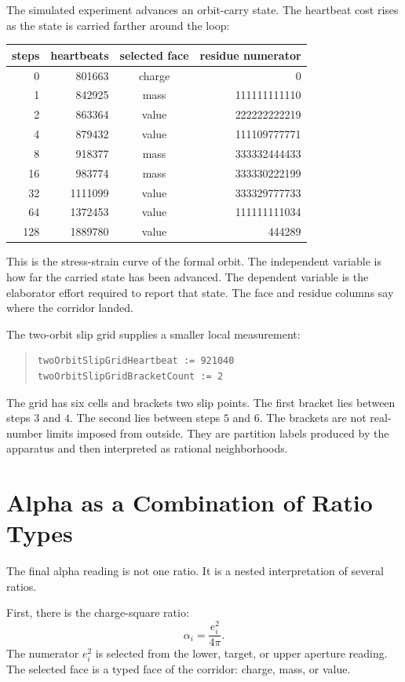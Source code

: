 The simulated experiment advances an orbit-carry state. The heartbeat cost rises as the state is carried farther
around the loop:
\begin{center}\small
\begin{tabular}{r|r|c|r}
steps & heartbeats & selected face & residue numerator\\
\hline
0 & 801663 & charge & 0\\
1 & 842925 & mass & 111111111110\\
2 & 863364 & value & 222222222219\\
4 & 879432 & value & 111109777771\\
8 & 918377 & mass & 333332444433\\
16 & 983774 & mass & 333330222199\\
32 & 1111099 & value & 333329777733\\
64 & 1372453 & value & 111111111034\\
128 & 1889780 & value & 444289
\end{tabular}
\end{center}
This is the stress-strain curve of the formal orbit. The independent variable is how far the carried state has
been advanced. The dependent variable is the elaborator effort required to report that state. The face and
residue columns say where the corridor landed.

The two-orbit slip grid supplies a smaller local measurement:
\begin{quote}\small
\begin{verbatim}
twoOrbitSlipGridHeartbeat := 921040
twoOrbitSlipGridBracketCount := 2
\end{verbatim}
\end{quote}
The grid has six cells and brackets two slip points. The first bracket lies between steps \(3\) and \(4\). The
second lies between steps \(5\) and \(6\). The brackets are not real-number limits imposed from outside. They
are partition labels produced by the apparatus and then interpreted as rational neighborhoods.

\section{Alpha as a Combination of Ratio Types}

The final alpha reading is not one ratio. It is a nested interpretation of several ratios.

First, there is the charge-square ratio:
\[
  \alpha_i = \frac{e_i^2}{4\pi}.
\]
The numerator \(e_i^2\) is selected from the lower, target, or upper aperture reading. The selected face is a
typed face of the corridor: charge, mass, or value.

